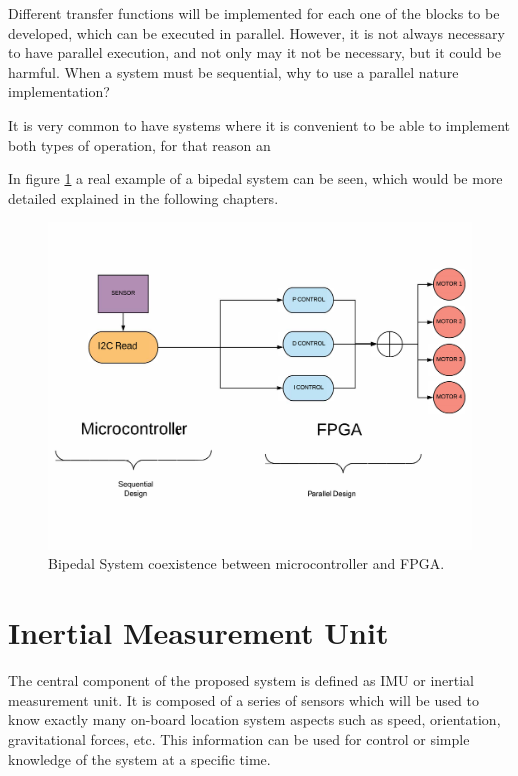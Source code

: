 Different transfer functions will be implemented for each one of the blocks to be developed, which can be executed in parallel.
However, it is not always necessary to have parallel execution, and not only may it not be necessary, but it could be harmful. When a system must be sequential, why to use a parallel nature implementation? \newline

It is very common to have systems where it is convenient to be able to implement both types of operation, for that reason an \newline

In figure \ref{fig:bipedo} a real example of a bipedal system can be seen, which would be more detailed explained in the following chapters.

\begin{center}
	\begin{figure}[H]
		\center
		\includegraphics[scale=0.4]{imagenes/EstadoArte/bipedo.pdf}
		\caption{Bipedal System coexistence between microcontroller and FPGA.}
		\label{fig:bipedo}
	\end{figure}
\end{center}
\section{Inertial Measurement Unit}\label{sec:IMU}
The central component of the proposed system is defined as IMU or inertial measurement unit. It is composed of a series of sensors which will be used to know exactly many on-board location system aspects such as speed, orientation, gravitational forces, etc. \newline
This information can be used for control or simple knowledge of the system at a specific time. \newline

